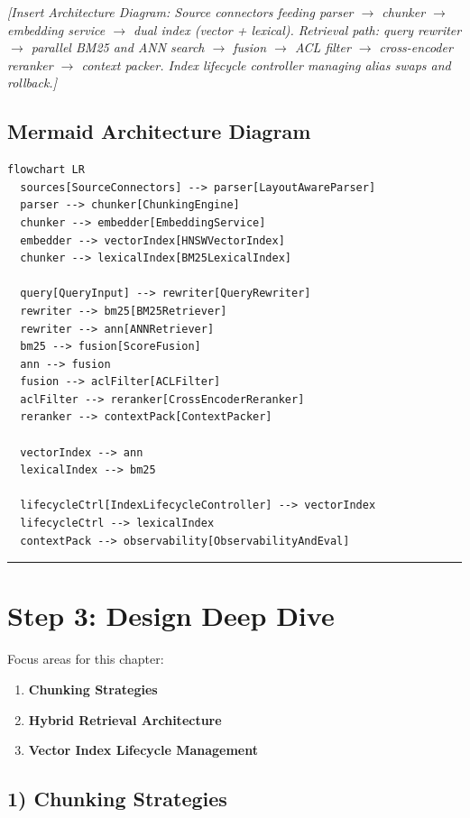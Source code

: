 \textit{[Insert Architecture Diagram: Source connectors feeding parser $\rightarrow$ chunker $\rightarrow$ embedding service $\rightarrow$ dual index (vector + lexical). Retrieval path: query rewriter $\rightarrow$ parallel BM25 and ANN search $\rightarrow$ fusion $\rightarrow$ ACL filter $\rightarrow$ cross-encoder reranker $\rightarrow$ context packer. Index lifecycle controller managing alias swaps and rollback.]}

\subsection*{Mermaid Architecture Diagram}

\begin{verbatim}
flowchart LR
  sources[SourceConnectors] --> parser[LayoutAwareParser]
  parser --> chunker[ChunkingEngine]
  chunker --> embedder[EmbeddingService]
  embedder --> vectorIndex[HNSWVectorIndex]
  chunker --> lexicalIndex[BM25LexicalIndex]

  query[QueryInput] --> rewriter[QueryRewriter]
  rewriter --> bm25[BM25Retriever]
  rewriter --> ann[ANNRetriever]
  bm25 --> fusion[ScoreFusion]
  ann --> fusion
  fusion --> aclFilter[ACLFilter]
  aclFilter --> reranker[CrossEncoderReranker]
  reranker --> contextPack[ContextPacker]

  vectorIndex --> ann
  lexicalIndex --> bm25

  lifecycleCtrl[IndexLifecycleController] --> vectorIndex
  lifecycleCtrl --> lexicalIndex
  contextPack --> observability[ObservabilityAndEval]
\end{verbatim}

\bigskip\hrule\bigskip

\section*{Step 3: Design Deep Dive}

Focus areas for this chapter:

\begin{enumerate}
  \item \textbf{Chunking Strategies}
  \item \textbf{Hybrid Retrieval Architecture}
  \item \textbf{Vector Index Lifecycle Management}
\end{enumerate}

\subsection*{1) Chunking Strategies}


